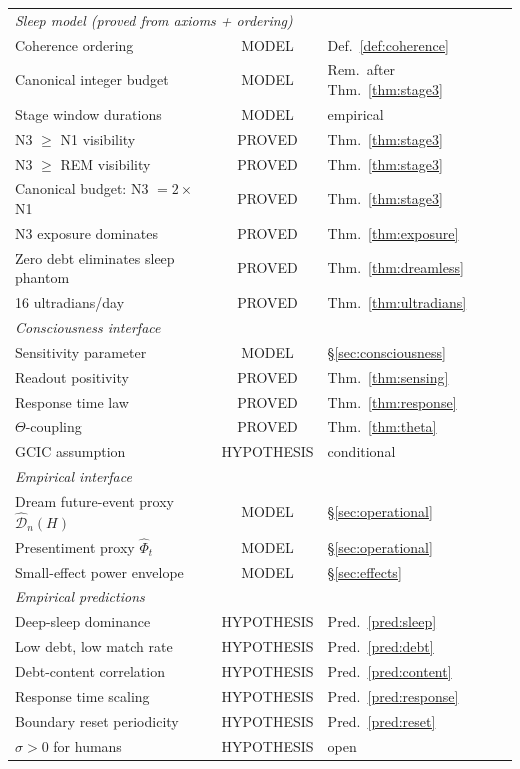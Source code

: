 \documentclass[11pt, a4paper]{article}
\theoremstyle{definition}
\theoremstyle{remark}
\begin{document}
\begin{center}
\begin{longtable}{p{4.2cm}cp{3.8cm}}
\midrule
\multicolumn{3}{l}{\textit{Sleep model (proved from axioms + ordering)}} \\
Coherence ordering & MODEL & Def.~\ref{def:coherence} \\
Canonical integer budget & MODEL & Rem.~after Thm.~\ref{thm:stage3} \\
Stage window durations & MODEL & empirical \\
N3 $\geq$ N1 visibility & PROVED & Thm.~\ref{thm:stage3} \\
N3 $\geq$ REM visibility & PROVED & Thm.~\ref{thm:stage3} \\
Canonical budget: N3 $= 2\times$ N1 & PROVED & Thm.~\ref{thm:stage3} \\
N3 exposure dominates & PROVED & Thm.~\ref{thm:exposure} \\
Zero debt eliminates sleep phantom & PROVED & Thm.~\ref{thm:dreamless} \\
16 ultradians/day & PROVED & Thm.~\ref{thm:ultradians} \\
\midrule
\multicolumn{3}{l}{\textit{Consciousness interface}} \\
Sensitivity parameter & MODEL & \S\ref{sec:consciousness} \\
Readout positivity & PROVED & Thm.~\ref{thm:sensing} \\
Response time law & PROVED & Thm.~\ref{thm:response} \\
$\Theta$-coupling & PROVED & Thm.~\ref{thm:theta} \\
GCIC assumption & HYPOTHESIS & conditional \\
\midrule
\multicolumn{3}{l}{\textit{Empirical interface}} \\
Dream future-event proxy $\widehat{\mathcal{D}}_n(H)$ & MODEL & \S\ref{sec:operational} \\
Presentiment proxy $\widehat{\Phi}_t$ & MODEL & \S\ref{sec:operational} \\
Small-effect power envelope & MODEL & \S\ref{sec:effects} \\
\midrule
\multicolumn{3}{l}{\textit{Empirical predictions}} \\
Deep-sleep dominance & HYPOTHESIS & Pred.~\ref{pred:sleep} \\
Low debt, low match rate & HYPOTHESIS & Pred.~\ref{pred:debt} \\
Debt-content correlation & HYPOTHESIS & Pred.~\ref{pred:content} \\
Response time scaling & HYPOTHESIS & Pred.~\ref{pred:response} \\
Boundary reset periodicity & HYPOTHESIS & Pred.~\ref{pred:reset} \\
$\sigma > 0$ for humans & HYPOTHESIS & open \\
\bottomrule
\end{longtable}
\end{center}
\end{document}
